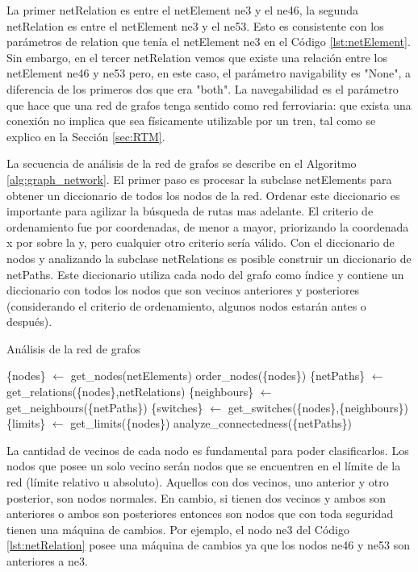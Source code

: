     La primer netRelation es entre el netElement ne3 y el ne46, la segunda netRelation es entre el netElement ne3 y el ne53. Esto es consistente con los parámetros de relation que tenía el netElement ne3 en el Código \ref{lst:netElement}. Sin embargo, en el tercer netRelation vemos que existe una relación entre los netElement ne46 y ne53 pero, en este caso, el parámetro navigability es "None", a diferencia de los primeros dos que era "both". La navegabilidad es el parámetro que hace que una red de grafos tenga sentido como red ferroviaria: que exista una conexión no implica que sea físicamente utilizable por un tren, tal como se explico en la Sección \ref{sec:RTM}.
    
    La secuencia de análisis de la red de grafos se describe en el Algoritmo \ref{alg:graph_network}. El primer paso es procesar la subclase netElements para obtener un diccionario de todos los nodos de la red. Ordenar este diccionario es importante para agilizar la búsqueda de rutas mas adelante. El criterio de ordenamiento fue por coordenadas, de menor a mayor, priorizando la coordenada x por sobre la y, pero cualquier otro criterio sería válido. Con el diccionario de nodos y analizando la subclase netRelations es posible construir un diccionario de netPaths. Este diccionario utiliza cada nodo del grafo como índice y contiene un diccionario con todos los nodos que son vecinos anteriores y posteriores (considerando el criterio de ordenamiento, algunos nodos estarán antes o después).
    
        \begin{algorithm}
            \caption{Análisis de la red de grafos}
            \label{alg:graph_network}
            \begin{algorithmic}
                \STATE \{nodes\} $\gets$ get\_nodes(netElements)
                \STATE  order\_nodes(\{nodes\})
                \STATE \{netPaths\} $\gets$ get\_relations(\{nodes\},netRelations)
                \STATE \{neighbours\} $\gets$ get\_neighbours(\{netPaths\})
                \STATE \{switches\} $\gets$ get\_switches(\{nodes\},\{neighbours\})
                \STATE \{limits\} $\gets$ get\_limits(\{nodes\})
                \STATE analyze\_connectedness(\{netPaths\})
            \end{algorithmic}
        \end{algorithm}

    La cantidad de vecinos de cada nodo es fundamental para poder clasificarlos. Los nodos que posee un solo vecino serán nodos que se encuentren en el límite de la red (límite relativo u absoluto). Aquellos con dos vecinos, uno anterior y otro posterior, son nodos normales. En cambio, si tienen dos vecinos y ambos son anteriores o ambos son posteriores entonces son nodos que con toda seguridad tienen una máquina de cambios. Por ejemplo, el nodo ne3 del Código \ref{lst:netRelation} posee una máquina de cambios ya que los nodos ne46 y ne53 son anteriores a ne3.

